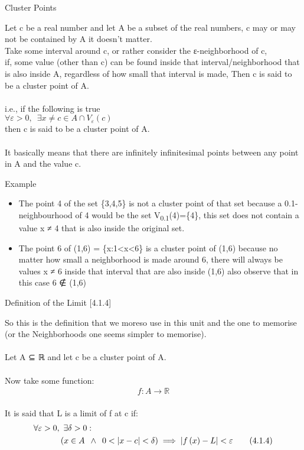 Cluster Points\protect\hypertarget{cluster-points}{}{}

Let {c} be a real number and let {A} be a subset of the real numbers,
{c} may or may not be contained by {A} it doesn't matter.\\
Take some interval around {c}, or rather consider the {ε}-neighborhood
of {c},\\
if, some value (other than {c}) can be found inside that
interval/neighborhood that is also inside {A}, regardless of how small
that interval is made, Then {c} is said to be a cluster point of {A}.\\
~\\
i.e., if the following is true\\
\(\forall \varepsilon > 0, \enspace \exists x\neq c \in A\cap V_{\varepsilon}(c)\)\\
then {c} is said to be a cluster point of {A}.\\
~\\
It basically means that there are infinitely infinitesimal points
between any point in {A} and the value {c}.

Example

\begin{itemize}
\tightlist
\item
  The point 4 of the set \{3,4,5\} is not a cluster point of that set
  because a 0.1-neighbourhood of 4 would be the set
  {V}\textsubscript{0.1}(4)=\{4\}, this set does not contain a value
  {x} ≠ 4 that is also inside the original set.\\
\item
  The point 6 of (1,6) = \{{x}:1\textless{}{x}\textless6\} is a cluster
  point of (1,6) because no matter how small a neighborhood is made
  around 6, there will always be values {x} ≠ 6 inside that interval
  that are also inside (1,6) also observe that in this case 6 ∉ (1,6)
\end{itemize}

Definition of the Limit
{[}4.1.4{]}\protect\hypertarget{definition-of-the-limit-4.1.4}{}{}

So this is the definition that we moreso use in this unit and the one to
memorise (or the Neighborhoods one seems simpler to memorise).\\
~\\
Let {A} ⊆ ℝ and let {c} be a cluster point of {A}.\\
~\\
Now take some function:\\
\[\begin{aligned} f: A \rightarrow
\mathbb{R} \label{clustlimdeffunc}
\end{aligned}\]\\
It is said that {L} is a limit of {f} at {c} if:\\
\[\begin{aligned} \forall
\varepsilon > 0, &\enspace
\exists \delta > 0:
\notag \\
\qquad & \left( x \in A
\enspace \wedge \enspace
0<\lvert x-c \rvert <
\delta \right) \implies
\lvert f\left( x \right) -
L \rvert < \varepsilon
\tag{4.1.4} \label{414}
\end{aligned}\]\\

